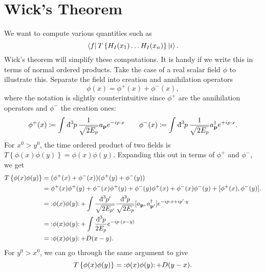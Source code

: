 
\section{Wick's Theorem}%
\label{sec:wick_s_theorem}

We want to compute various quantities such as 
\begin{equation}
  \bra{f} T \left\{ H_I (x_1) \dots H_I(x_n) \right\} \ket{i}.
\end{equation}
Wick's theorem will simplify these computations.
It is handy if we write this in terms of normal ordered products.
Take the case of a real scalar field $\phi$ to illustrate this.
Separate the field into creation and annihilation operators
\begin{equation}
  \phi(x) = \phi^+(x) + \phi^-(x),
\end{equation}
where the notation is slightly counterintuitive since $\phi^+$ are the annihilation operators and $\phi^-$ the creation ones:
\begin{equation}
  \phi^+(x) \coloneqq \int_{}^{} \bdd[3]{p} \frac{1}{\sqrt{2 E_p}} a_{\vb{p}} e^{-ip \cdot x} \qquad
  \phi^-(x) \coloneqq \int_{}^{} \bdd[3]{p} \frac{1}{\sqrt{2 E_p}} a^{\dagger}_{\vb{p}} e^{+ip \cdot x}.
\end{equation}
For $x^0 > y^0$, the time ordered product of two fields is $T \left\{ \phi(x) \phi(y) \right\} = \phi(x) \phi(y)$.
Expanding this out in terms of $\phi^+$ and $\phi^-$, we get
\begin{align}
  T \left\{ \phi(x) \phi(y) \right\} &= (\phi^+(x) + \phi^-(x)) (\phi^+(y) + \phi^-(y)) \\
				     &=\phi^+(x) \phi^+(y) + \phi^-(x) \phi^+(y) + \phi^-(y) \phi^+(x) + \phi^-(x) \phi^-(y) + [\phi^+(x), \phi^-(y)]. \\
				     &= \normalorder{\phi(x) \phi(y) } + \int \frac{\bdd[3]{p'}}{\sqrt{2 E_{p'}}} \frac{\bdd[3]{p}}{\sqrt{2 E_p}} [a_{\vb{p}}, a_{\vb{p}'}^{\dagger}] e^{-i p \cdot x + i p' \cdot y} \\
				     &= \normalorder{\phi(x) \phi(y) } + \int \frac{\bdd[3]{p}}{2 E_p} e^{-ip \cdot (x - y)} \\
				     &= \normalorder{\phi(x) \phi(y) } + D(x - y).
\end{align}
For $y^0 > x^0$, we can go through the same argument to give
\begin{equation}
  T \left\{ \phi(x) \phi(y) \right\} = \normalorder{\phi(x) \phi(y) } + D(y - x).
\end{equation}
